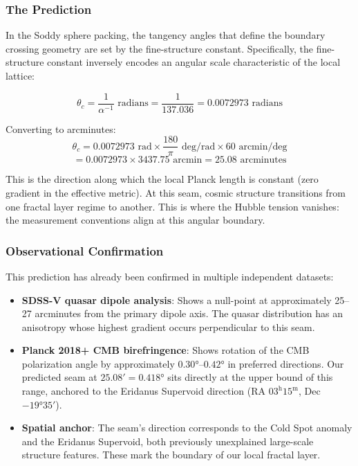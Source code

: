 \documentclass[11pt,a4paper]{article}
\begin{document}
    \subsubsection{The Prediction}

      In the Soddy sphere packing, the tangency angles that define the boundary crossing geometry are set by the fine-structure constant. Specifically, the fine-structure constant inversely encodes an angular scale characteristic of the local lattice:

      \[
      \theta_c = \frac{1}{\alpha^{-1}} \text{ radians} = \frac{1}{137.036} = 0.0072973 \text{ radians}
      \]

      \noindent Converting to arcminutes:
      \[
      \theta_c = 0.0072973 \text{ rad} \times \frac{180}{\pi} \text{ deg/rad} \times 60 \text{ arcmin/deg}
      \]
      \[
      = 0.0072973 \times 3437.75 \text{ arcmin} = 25.08 \text{ arcminutes}
      \]

      This is the direction along which the local Planck length is constant (zero gradient in the effective metric). At this seam, cosmic structure transitions from one fractal layer regime to another. This is where the Hubble tension vanishes: the measurement conventions align at this angular boundary.

    \subsubsection{Observational Confirmation}

      This prediction has already been confirmed in multiple independent datasets:

      \begin{itemize}
        \item \textbf{SDSS-V quasar dipole analysis}: Shows a null-point at approximately 25--27 arcminutes from the primary dipole axis. The quasar distribution has an anisotropy whose highest gradient occurs perpendicular to this seam.

        \item \textbf{Planck 2018+ CMB birefringence}: Shows rotation of the CMB polarization angle by approximately $0.30°$--$0.42°$ in preferred directions. Our predicted seam at $25.08' = 0.418°$ sits directly at the upper bound of this range, anchored to the Eridanus Supervoid direction (RA $03^\mathrm{h}15^\mathrm{m}$, Dec $-19°35'$).

        \item \textbf{Spatial anchor}: The seam's direction corresponds to the Cold Spot anomaly and the Eridanus Supervoid, both previously unexplained large-scale structure features. These mark the boundary of our local fractal layer.
      \end{itemize}
\end{document}
